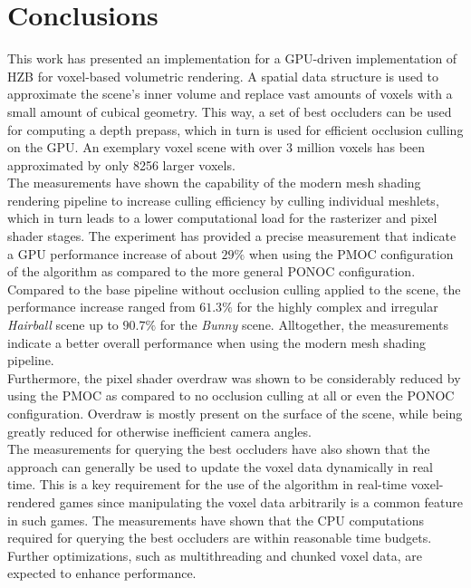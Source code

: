 \chapter{Conclusions} \label{cpt-conclusion}


This work has presented an implementation for a \ac{GPU}-driven implementation of 
\ac{HZB} for voxel-based volumetric rendering. A spatial data structure is 
used to approximate the scene's inner volume and replace vast amounts of voxels 
with a small amount of cubical geometry. This way, a set of best occluders can 
be used for computing a depth prepass, which in turn is used for efficient 
occlusion culling on the \ac{GPU}. An exemplary voxel scene with over 3 million 
voxels has been approximated by only 8256 larger voxels.  \\


\noindent
The measurements have shown the capability of the modern mesh shading rendering 
pipeline to increase culling efficiency by culling individual meshlets, which in 
turn leads to a lower computational load for the rasterizer and pixel shader 
stages. The experiment has provided a precise measurement that indicate a \ac{GPU} 
performance increase of about $29 \%$ when using the \ac{PMOC} configuration 
of the algorithm as compared to the more general \ac{PONOC} configuration. 
Compared to the base pipeline without occlusion culling applied to the scene, the 
performance increase ranged from $61.3 \%$ for the highly complex and irregular 
\emph{Hairball} scene up to $90.7 \%$ for the \emph{Bunny} scene. Alltogether, the 
measurements indicate a better overall performance when using the modern mesh shading 
pipeline.\\

\noindent
Furthermore, the pixel shader overdraw was shown to be considerably reduced by using 
the \ac{PMOC} as compared to no occlusion culling at all or even the \ac{PONOC} 
configuration. Overdraw is mostly present on the surface of the scene, while being 
greatly reduced for otherwise inefficient camera angles. \\

\noindent
The measurements for querying the best occluders have also shown that the approach can 
generally be used to update the voxel data dynamically in real time. This is a key 
requirement for the use of the algorithm in real-time voxel-rendered games since 
manipulating the voxel data arbitrarily is a common feature in such games. The 
measurements have shown that the \ac{CPU} computations required for querying the 
best occluders are within reasonable time budgets. Further optimizations, such as 
multithreading and chunked voxel data, are expected to enhance performance. \\

